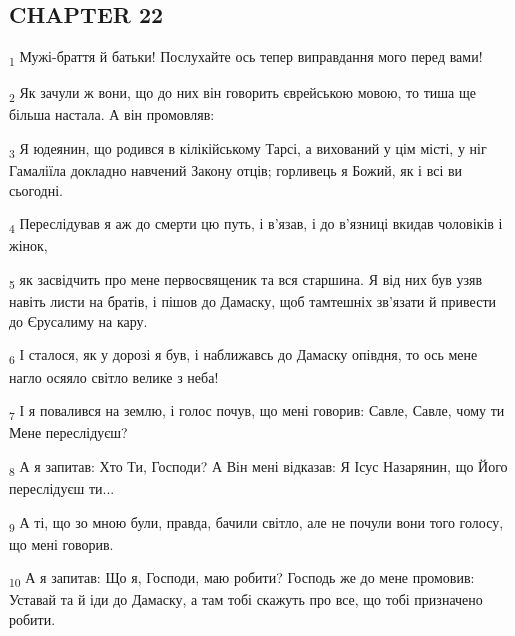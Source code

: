 \subsection{CHAPTER 22}
\begin{tcolorbox}
\textsubscript{1} Мужі-браття й батьки! Послухайте ось тепер виправдання мого перед вами!
\end{tcolorbox}
\begin{tcolorbox}
\textsubscript{2} Як зачули ж вони, що до них він говорить єврейською мовою, то тиша ще більша настала. А він промовляв:
\end{tcolorbox}
\begin{tcolorbox}
\textsubscript{3} Я юдеянин, що родився в кілікійському Тарсі, а вихований у цім місті, у ніг Гамаліїла докладно навчений Закону отців; горливець я Божий, як і всі ви сьогодні.
\end{tcolorbox}
\begin{tcolorbox}
\textsubscript{4} Переслідував я аж до смерти цю путь, і в'язав, і до в'язниці вкидав чоловіків і жінок,
\end{tcolorbox}
\begin{tcolorbox}
\textsubscript{5} як засвідчить про мене первосвященик та вся старшина. Я від них був узяв навіть листи на братів, і пішов до Дамаску, щоб тамтешніх зв'язати й привести до Єрусалиму на кару.
\end{tcolorbox}
\begin{tcolorbox}
\textsubscript{6} І сталося, як у дорозі я був, і наближавсь до Дамаску опівдня, то ось мене нагло осяяло світло велике з неба!
\end{tcolorbox}
\begin{tcolorbox}
\textsubscript{7} І я повалився на землю, і голос почув, що мені говорив: Савле, Савле, чому ти Мене переслідуєш?
\end{tcolorbox}
\begin{tcolorbox}
\textsubscript{8} А я запитав: Хто Ти, Господи? А Він мені відказав: Я Ісус Назарянин, що Його переслідуєш ти...
\end{tcolorbox}
\begin{tcolorbox}
\textsubscript{9} А ті, що зо мною були, правда, бачили світло, але не почули вони того голосу, що мені говорив.
\end{tcolorbox}
\begin{tcolorbox}
\textsubscript{10} А я запитав: Що я, Господи, маю робити? Господь же до мене промовив: Уставай та й іди до Дамаску, а там тобі скажуть про все, що тобі призначено робити.
\end{tcolorbox}
